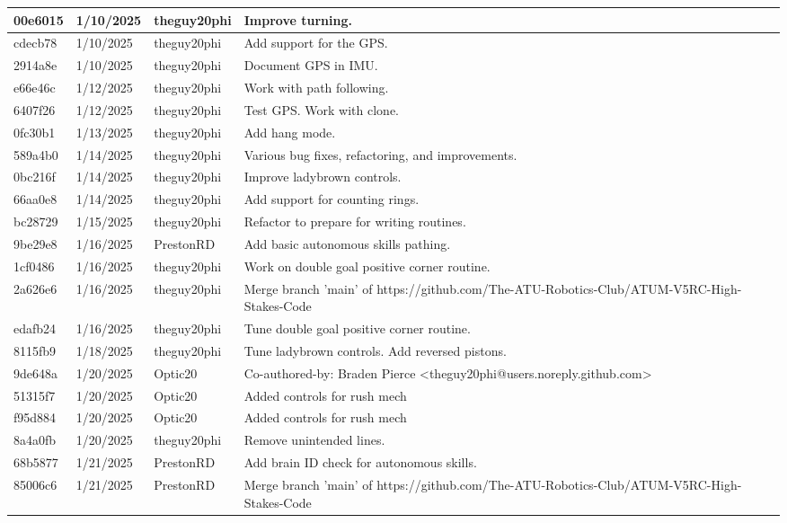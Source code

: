 \begin{center}
\begin{longtable}{|p{28pt}|p{33pt}|p{40pt}|p{300pt}|}
\hline
00e6015 & 1/10/2025 & theguy20phi & Improve turning. \\
\hline
cdecb78 & 1/10/2025 & theguy20phi & Add support for the GPS. \\
\hline
2914a8e & 1/10/2025 & theguy20phi & Document GPS in IMU. \\
\hline
e66e46c & 1/12/2025 & theguy20phi & Work with path following. \\
\hline
6407f26 & 1/12/2025 & theguy20phi & Test GPS. Work with clone. \\
\hline
0fc30b1 & 1/13/2025 & theguy20phi & Add hang mode. \\
\hline
589a4b0 & 1/14/2025 & theguy20phi & Various bug fixes, refactoring, and improvements. \\
\hline
0bc216f & 1/14/2025 & theguy20phi & Improve ladybrown controls. \\
\hline
66aa0e8 & 1/14/2025 & theguy20phi & Add support for counting rings. \\
\hline
bc28729 & 1/15/2025 & theguy20phi & Refactor to prepare for writing routines. \\
\hline
9be29e8 & 1/16/2025 & PrestonRD & Add basic autonomous skills pathing. \\
\hline
1cf0486 & 1/16/2025 & theguy20phi & Work on double goal positive corner routine. \\
\hline
2a626e6 & 1/16/2025 & theguy20phi & Merge branch 'main' of https://github.com/The-ATU-Robotics-Club/ATUM-V5RC-High-Stakes-Code \\
\hline
edafb24 & 1/16/2025 & theguy20phi & Tune double goal positive corner routine. \\
\hline
8115fb9 & 1/18/2025 & theguy20phi & Tune ladybrown controls. Add reversed pistons. \\
\hline
9de648a & 1/20/2025 & Optic20 & Co-authored-by: Braden Pierce <theguy20phi@users.noreply.github.com> \\
\hline
51315f7 & 1/20/2025 & Optic20 & Added controls for rush mech \\
\hline
f95d884 & 1/20/2025 & Optic20 & Added controls for rush mech \\
\hline
8a4a0fb & 1/20/2025 & theguy20phi & Remove unintended lines. \\
\hline
68b5877 & 1/21/2025 & PrestonRD & Add brain ID check for autonomous skills. \\
\hline
85006c6 & 1/21/2025 & PrestonRD & Merge branch 'main' of https://github.com/The-ATU-Robotics-Club/ATUM-V5RC-High-Stakes-Code \\

\end{longtable}
\end{center}
